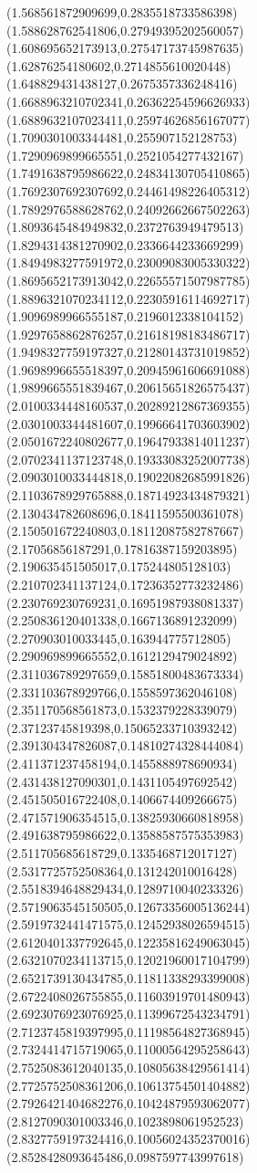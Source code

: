 {(1.568561872909699,0.2835518733586398)
(1.588628762541806,0.27949395202560057)
(1.608695652173913,0.27547173745987635)
(1.62876254180602,0.2714855610020448)
(1.648829431438127,0.2675357336248416)
(1.6688963210702341,0.26362254596626933)
(1.6889632107023411,0.25974626856167077)
(1.7090301003344481,0.255907152128753)
(1.7290969899665551,0.2521054277432167)
(1.7491638795986622,0.24834130705410865)
(1.7692307692307692,0.24461498226405312)
(1.7892976588628762,0.24092662667502263)
(1.8093645484949832,0.2372763949479513)
(1.8294314381270902,0.2336644233669299)
(1.8494983277591972,0.23009083005330322)
(1.8695652173913042,0.22655571507987785)
(1.8896321070234112,0.22305916114692717)
(1.9096989966555187,0.2196012338104152)
(1.9297658862876257,0.21618198183486717)
(1.9498327759197327,0.21280143731019852)
(1.9698996655518397,0.20945961606691088)
(1.9899665551839467,0.20615651826575437)
(2.0100334448160537,0.20289212867369355)
(2.0301003344481607,0.19966641703603902)
(2.0501672240802677,0.19647933814011237)
(2.0702341137123748,0.19333083252007738)
(2.0903010033444818,0.19022082685991826)
(2.1103678929765888,0.18714923434879321)
(2.130434782608696,0.18411595500361078)
(2.150501672240803,0.18112087582787667)
(2.17056856187291,0.17816387159203895)
(2.190635451505017,0.175244805128103)
(2.210702341137124,0.17236352773232486)
(2.230769230769231,0.16951987938081337)
(2.250836120401338,0.1667136891232099)
(2.270903010033445,0.163944775712805)
(2.290969899665552,0.1612129479024892)
(2.311036789297659,0.15851800483673334)
(2.331103678929766,0.1558597362046108)
(2.351170568561873,0.1532379228339079)
(2.37123745819398,0.15065233710393242)
(2.391304347826087,0.14810274328444084)
(2.411371237458194,0.1455888978690934)
(2.431438127090301,0.1431105497692542)
(2.451505016722408,0.1406674409266675)
(2.471571906354515,0.13825930660818958)
(2.491638795986622,0.13588587575353983)
(2.511705685618729,0.1335468712017127)
(2.5317725752508364,0.131242010016428)
(2.5518394648829434,0.1289710040233326)
(2.5719063545150505,0.12673356005136244)
(2.5919732441471575,0.12452938026594515)
(2.6120401337792645,0.12235816249063045)
(2.6321070234113715,0.12021960017104799)
(2.6521739130434785,0.11811338293399008)
(2.6722408026755855,0.11603919701480943)
(2.6923076923076925,0.11399672543234791)
(2.7123745819397995,0.11198564827368945)
(2.7324414715719065,0.11000564295258643)
(2.7525083612040135,0.10805638429561414)
(2.7725752508361206,0.10613754501404882)
(2.7926421404682276,0.10424879593062077)
(2.8127090301003346,0.1023898061952523)
(2.8327759197324416,0.10056024352370016)
(2.8528428093645486,0.0987597743997618)
}
